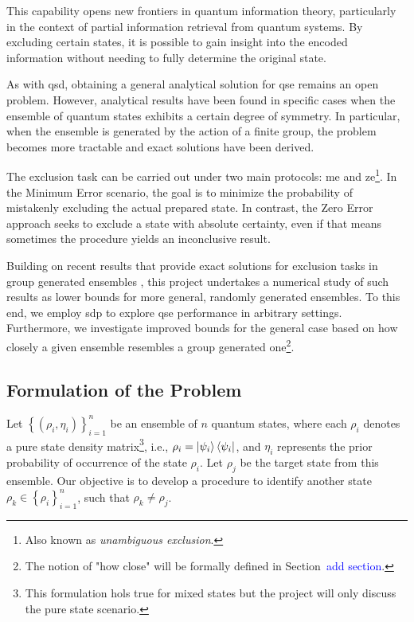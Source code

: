 \documentclass[12pt,letterpaper]{article}
\begin{document}
\begin{multicols}{2}
This capability opens new frontiers in quantum information theory, particularly in the context of partial information retrieval from quantum systems. By excluding certain states, it is possible to gain insight into the encoded information without needing to fully determine the original state.

As with \gls{qsd}, obtaining a general analytical solution for \gls{qse} remains an open problem. However, analytical results have been found in specific cases when the ensemble of quantum states exhibits a certain degree of symmetry. In particular, when the ensemble is generated by the action of a finite group, the problem becomes more tractable and exact solutions have been derived.

The exclusion task can be carried out under two main protocols: \gls{me} and \gls{ze}\footnote{Also known as \emph{unambiguous exclusion}.}. In the Minimum Error scenario, the goal is to minimize the probability of mistakenly excluding the actual prepared state. In contrast, the Zero Error approach seeks to exclude a state with absolute certainty, even if that means sometimes the procedure yields an inconclusive result.

Building on recent results that provide exact solutions for exclusion tasks in group generated ensembles \cite{MainPaper}, this project undertakes a numerical study of such results as lower bounds for more general, randomly generated ensembles. To this end, we employ \gls{sdp} to explore \gls{qse} performance in arbitrary settings. Furthermore, we investigate improved bounds for the general case based on how closely a given ensemble resembles a group generated one\footnote{The notion of "how close" will be formally defined in Section~\textcolor{blue}{add section}.}.

\subsection{Formulation of the Problem}\label{sectionFormulationOfTheProblem}

Let $\left\{(\rho_i, \eta_i)\right\}_{i=1}^n$ be an ensemble of $n$ quantum states, where each $\rho_i$ denotes a pure state density matrix\footnote{This formulation hols true for mixed states but the project will only discuss the pure state scenario.}, i.e., $\rho_i = \ket{\psi_i}\bra{\psi_i}$, and $\eta_i$ represents the prior probability of occurrence of the state $\rho_i$. Let $\rho_j$ be the target state from this ensemble. Our objective is to develop a procedure to identify another state $\rho_k \in \left\{\rho_i\right\}_{i=1}^n$, such that $\rho_k \neq \rho_j$.


\end{multicols}
\end{document}
